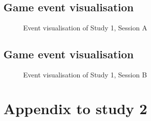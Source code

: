 \section{Game event visualisation}
\begin{figure}[H]
  \centering
  \caption{Event visualisation of Study 1, Session A}
  
\end{figure}

\section{Game event visualisation}
\begin{figure}[H]
  \centering
  \caption{Event visualisation of Study 1, Session B}
 
\end{figure}



\chapter{Appendix to study 2}



